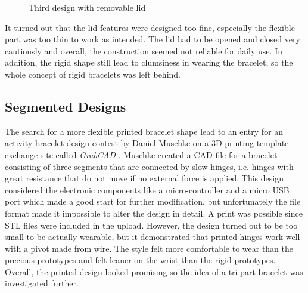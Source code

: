 \begin{figure}[bth]
	\myfloatalign
	 \quad
	\caption{Third design with removable lid}
\end{figure}

It turned out that the lid features were designed too fine, especially the flexible part was too thin to work as intended. The lid had to be opened and closed very cautiously and overall, the construction seemed not reliable for daily use. In addition, the rigid shape still lead to clumsiness in wearing the bracelet, so the whole concept of rigid bracelets was left behind.

\subsection{Segmented Designs}

The search for a more flexible printed bracelet shape lead to an entry for an activity bracelet design contest by Daniel Muschke on a 3D printing template exchange site called \textit{GrabCAD} \cite{amicobracelet}. Muschke created a \ac{CAD} file for a bracelet consisting of three segments that are connected by slow hinges, i.e. hinges with great resistance that do not move if no external force is applied. This design considered the electronic components like a micro-controller and a micro \ac{USB} port which made a good start for further modification, but unfortunately the file format made it impossible to alter the design in detail. A print was possible since \ac{STL} files were included in the upload. However, the design turned out to be too small to be actually wearable, but it demonstrated that printed hinges work well with a pivot made from wire. The style felt more comfortable to wear than the precious prototypes and felt leaner on the wrist than the rigid prototypes. Overall, the printed design looked promising so the idea of a tri-part bracelet was investigated further.


